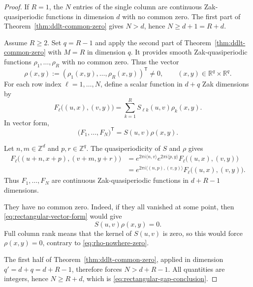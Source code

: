 \documentclass[11pt,reqno]{amsart}
\numberwithin{equation}{section}
\theoremstyle{definition}
\theoremstyle{remark}
\newcommand{\R}{\mathbb R}
\newcommand{\Z}{\mathbb Z}
\newcommand{\ip}[2]{\langle #1,#2\rangle}
\begin{document}
\begin{proof}
If $R=1$, the $N$ entries of the single column are continuous
Zak-quasiperiodic functions in dimension $d$ with no common zero.  The first
part of Theorem~\ref{thm:ddlt-common-zero} gives $N>d$, hence
$N\ge d+1=R+d$.

Assume $R\ge2$.  Set $q=R-1$ and apply the second part of
Theorem~\ref{thm:ddlt-common-zero} with $M=R$ in dimension $q$.  It provides
smooth Zak-quasiperiodic functions $\rho_1,\ldots,\rho_R$ with no common
zero.  Thus the vector
\begin{equation}\label{eq:rho-nowhere-zero}
 \rho(x,y):=(\rho_1(x,y),\ldots,\rho_R(x,y))^{\mathsf T}
 \ne0,
 \qquad (x,y)\in\R^q\times\R^q.
\end{equation}
For each row index $\ell=1,\ldots,N$, define a scalar function in $d+q$
Zak dimensions by
\begin{equation}\label{eq:rectangular-amplified-functions}
 F_\ell\bigl((u,x),(v,y)\bigr)
   =\sum_{k=1}^R S_{\ell k}(u,v)\rho_k(x,y).
\end{equation}
In vector form,
\begin{equation}\label{eq:rectangular-vector-form}
 \bigl(F_1,\ldots,F_N\bigr)^{\mathsf T}
       =S(u,v)\rho(x,y).
\end{equation}

Let $n,m\in\Z^d$ and $p,r\in\Z^q$.  The quasiperiodicity of $S$ and $\rho$
gives
\begin{align*}
 F_\ell\bigl((u+n,x+p),(v+m,y+r)\bigr)
  &=e^{2\pi i\ip{n}{v}}
           e^{2\pi i\ip{p}{y}}
           F_\ell\bigl((u,x),(v,y)\bigr)\\
  &=e^{2\pi i\ip{(n,p)}{(v,y)}}
           F_\ell\bigl((u,x),(v,y)\bigr).
\end{align*}
Thus $F_1,\ldots,F_N$ are continuous Zak-quasiperiodic functions in
$d+R-1$ dimensions.

They have no common zero.  Indeed, if they all vanished at some point, then
\eqref{eq:rectangular-vector-form} would give
\[
                         S(u,v)\rho(x,y)=0.
\]
Full column rank means that the kernel of $S(u,v)$ is zero, so this would
force $\rho(x,y)=0$, contrary to
\eqref{eq:rho-nowhere-zero}.

The first half of Theorem~\ref{thm:ddlt-common-zero}, applied in dimension
$q'=d+q=d+R-1$, therefore forces
\(
                            N>d+R-1.
\)
All quantities are integers, hence $N\ge R+d$, which is
\eqref{eq:rectangular-gap-conclusion}.


\end{proof}
\end{document}

